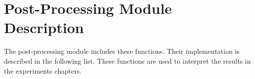 \documentclass[.\jobname.tex]{subfiles}
\begin{document}
\begin{figure}[H]
	\centering
	\noindent{}
	\label{fig:software_architecture}
\end{figure}


\chapter{Post-Processing Module Description}
\label{chap:apendix_post_proc}
The post-processing module includes these functions. Their implementation is described in the following list. These functions are used to interpret the results in the experiments chapters.  
\end{document}
